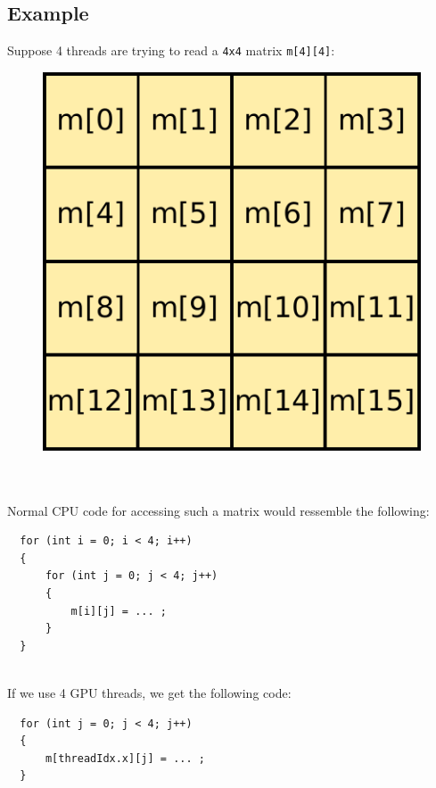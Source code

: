 \documentclass[12pt, a4paper]{report}
\begin{document}
\subsection{Example}
Suppose 4 threads are trying to read a \verb+4x4+ matrix \verb+m[4][4]+:

\begin{figure}[h]
\centering
\includegraphics[scale=0.50]{figs/4x4_matrix}
\label{fig:4x4_matrix}
\end{figure}

\hspace{0pt} \\ \\
Normal CPU code for accessing such a matrix would ressemble the following:
\begin{lstlisting}
  for (int i = 0; i < 4; i++)
  {
      for (int j = 0; j < 4; j++)
      {
          m[i][j] = ... ;
      }
  }
\end{lstlisting}

\hspace{0pt} \\
If we use 4 GPU threads, we get the following code:

\begin{lstlisting}
  for (int j = 0; j < 4; j++)
  {
      m[threadIdx.x][j] = ... ;
  }
\end{lstlisting}
\end{document}
